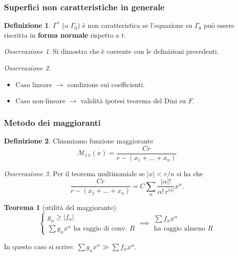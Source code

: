 \documentclass[serif,notheorems]{beamer}
\theoremstyle{definition} %
\newtheorem{theorem}{Teorema}[section] %
\newtheorem{definition}{Definizione}[section] %
\theoremstyle{remark}
\newtheorem*{remark}{Osservazione}
\begin{document}
\begin{frame}
\frametitle{Superfici non caratteristiche in generale}
\begin{definition}
$\Gamma^*$ (o $\Gamma_0$) è non caratteristica se l'equazione su $\Gamma_0$ può essere riscritta in \textbf{forma normale} rispetto a $t$.
\end{definition}
\begin{remark}
Si dimostra che è coerente con le definizioni precedenti.
\end{remark}
\begin{remark}
\begin{itemize}
\item Caso lineare $\rightarrow$ condizione sui coefficienti.
\item Caso non-lineare $\rightarrow$ validità ipotesi teorema del Dini su $F$.
\end{itemize}
\end{remark}
\end{frame}


\begin{frame}
\frametitle{Metodo dei maggioranti}
\begin{definition}
Chiamiamo funzione maggiorante $$\mathcal{M}_{Cr}(x)=\frac{Cr}{r-(x_1+\ldots +x_n)}$$
\end{definition}
\begin{remark}
Per il teorema multinomiale se $|x|<r/n$ si ha che
$$\frac{Cr}{r-(x_1+\ldots +x_n)}=C \sum\limits_\alpha \frac{|\alpha |!}{\alpha ! \, r^{|\alpha |}} x^\alpha.$$
\end{remark}
\end{frame}

\begin{frame}
\begin{theorem}[utilità del maggiorante]
\begin{equation*}
\begin{cases}
g_\alpha \geq |f_\alpha|\\
\sum g_\alpha x^\alpha \text{ ha raggio di conv. } R
\end{cases}
\implies 
\begin{array}{c}
\sum f_\alpha x^\alpha \\
\text{ha raggio almeno } R
\end{array}
\end{equation*}
\end{theorem}
In questo caso si scrive:  $\sum g_\alpha x^\alpha \gg \sum f_\alpha x^\alpha$.
\end{frame}
\end{document}

